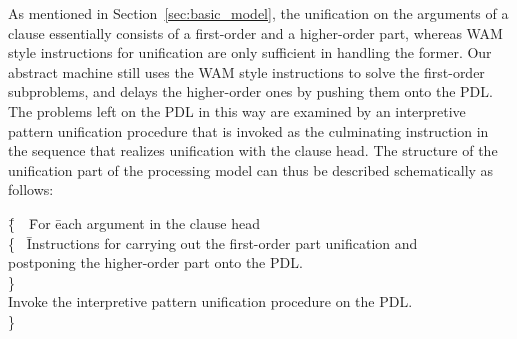 As mentioned in Section~\ref{sec:basic_model}, the unification
on the arguments of a clause essentially consists of a
first-order and a higher-order part,
whereas WAM style instructions
for unification are only sufficient in handling the former.
Our abstract machine still uses the WAM
style instructions to solve the first-order subproblems, and delays the
higher-order ones by pushing them onto the PDL. The problems left on
the PDL in this way are examined by an interpretive pattern
unification procedure that is invoked as the culminating instruction
in the sequence that realizes unification with the clause head.
The structure of the unification part of the processing model can thus
be described schematically as follows:
\begin{tabbing}
\quad\= \{\ \ \=  For \=each argument in the clause head       \\
\>       \>         \>\{ \ \=Instructions for carrying out the first-order part unification and  \\
\>       \>         \>     \>postponing the higher-order part onto the PDL.     \\
\>       \>         \>\} \\
\>       \> Invoke the interpretive pattern unification procedure on the PDL. \\
\> \}
\end{tabbing}



